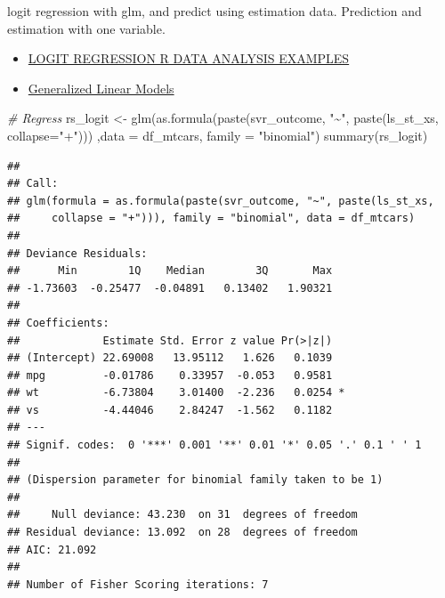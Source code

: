 \documentclass[
]{book}
\newenvironment{Shaded}{\begin{snugshade}}{\end{snugshade}}
\newcommand{\AttributeTok}[1]{\textcolor[rgb]{0.77,0.63,0.00}{#1}}
\newcommand{\CommentTok}[1]{\textcolor[rgb]{0.56,0.35,0.01}{\textit{#1}}}
\newcommand{\FunctionTok}[1]{\textcolor[rgb]{0.00,0.00,0.00}{#1}}
\newcommand{\NormalTok}[1]{#1}
\newcommand{\OtherTok}[1]{\textcolor[rgb]{0.56,0.35,0.01}{#1}}
\newcommand{\SpecialCharTok}[1]{\textcolor[rgb]{0.00,0.00,0.00}{#1}}
\newcommand{\StringTok}[1]{\textcolor[rgb]{0.31,0.60,0.02}{#1}}
\providecommand{\tightlist}{%
  \setlength{\itemsep}{0pt}\setlength{\parskip}{0pt}}
\begin{document}
logit regression with glm, and predict using estimation data. Prediction and estimation with one variable.

\begin{itemize}
\tightlist
\item
  \href{https://stats.idre.ucla.edu/r/dae/logit-regression/}{LOGIT REGRESSION R DATA ANALYSIS EXAMPLES}
\item
  \href{https://www.statmethods.net/advstats/glm.html}{Generalized Linear Models}
\end{itemize}

\begin{Shaded}
\begin{Highlighting}[]
\CommentTok{\# Regress}
\NormalTok{rs\_logit }\OtherTok{\textless{}{-}} \FunctionTok{glm}\NormalTok{(}\FunctionTok{as.formula}\NormalTok{(}\FunctionTok{paste}\NormalTok{(svr\_outcome, }\StringTok{"\textasciitilde{}"}\NormalTok{, }\FunctionTok{paste}\NormalTok{(ls\_st\_xs, }\AttributeTok{collapse=}\StringTok{"+"}\NormalTok{)))}
\NormalTok{                ,}\AttributeTok{data =}\NormalTok{ df\_mtcars, }\AttributeTok{family =} \StringTok{"binomial"}\NormalTok{)}
\FunctionTok{summary}\NormalTok{(rs\_logit)}
\end{Highlighting}
\end{Shaded}

\begin{verbatim}
## 
## Call:
## glm(formula = as.formula(paste(svr_outcome, "~", paste(ls_st_xs, 
##     collapse = "+"))), family = "binomial", data = df_mtcars)
## 
## Deviance Residuals: 
##      Min        1Q    Median        3Q       Max  
## -1.73603  -0.25477  -0.04891   0.13402   1.90321  
## 
## Coefficients:
##             Estimate Std. Error z value Pr(>|z|)  
## (Intercept) 22.69008   13.95112   1.626   0.1039  
## mpg         -0.01786    0.33957  -0.053   0.9581  
## wt          -6.73804    3.01400  -2.236   0.0254 *
## vs          -4.44046    2.84247  -1.562   0.1182  
## ---
## Signif. codes:  0 '***' 0.001 '**' 0.01 '*' 0.05 '.' 0.1 ' ' 1
## 
## (Dispersion parameter for binomial family taken to be 1)
## 
##     Null deviance: 43.230  on 31  degrees of freedom
## Residual deviance: 13.092  on 28  degrees of freedom
## AIC: 21.092
## 
## Number of Fisher Scoring iterations: 7
\end{verbatim}

\begin{Shaded}
\end{Shaded}
\end{document}

